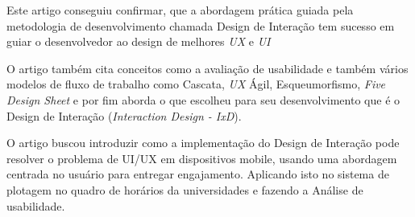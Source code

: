 Este artigo conseguiu confirmar, que a abordagem prática guiada pela metodologia de desenvolvimento chamada Design de Interação tem sucesso em guiar o desenvolvedor ao design de melhores \textit{UX} e \textit{UI}

O artigo também cita conceitos como a avaliação de usabilidade e também vários modelos de fluxo de trabalho como Cascata, \textit{UX} Ágil, Esqueumorfismo, \textit{Five Design Sheet} e por fim aborda o que escolheu para seu desenvolvimento que é o Design de Interação (\textit{Interaction Design - IxD}).

O artigo buscou introduzir como a implementação do Design de Interação pode resolver o problema de UI/UX em dispositivos mobile, usando uma abordagem centrada no usuário para entregar engajamento. Aplicando isto no sistema de plotagem no quadro de horários da universidades e fazendo a Análise de usabilidade.
